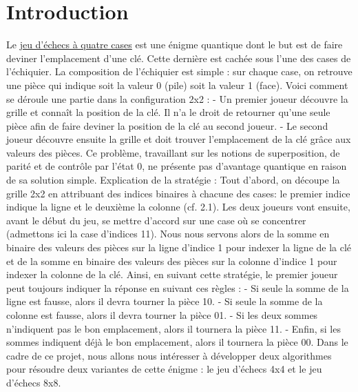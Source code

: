 \documentclass[12pt]{article}
\begin{document}
\section{Introduction}
Le \href{https://www.youtube.com/watch?v=LFwXghcajLw&list=PLtn704u3JW-K4q9YkQWTfWRxaq-9oLfJ3&index=4}{jeu d'échecs à quatre cases} est une énigme quantique dont le but est de faire deviner l'emplacement d'une clé. Cette dernière est cachée sous l'une des cases de l'échiquier.\newline
\newline
La composition de l'échiquier est simple : sur chaque case, on retrouve une pièce qui indique soit la valeur 0 (pile) soit la valeur 1 (face).\newline
\newline
Voici comment se déroule une partie dans la configuration 2x2 :
\newline
- Un premier joueur découvre la grille et connaît la position de la clé. Il n'a le droit de retourner qu'une seule pièce afin de faire deviner la position de la clé au second joueur.
\newline
- Le second joueur découvre ensuite la grille et doit trouver l'emplacement de la clé grâce aux valeurs des pièces.\newline
\newline
Ce problème, travaillant sur les notions de superposition, de parité et de contrôle par l'état 0, ne présente pas d'avantage quantique en raison de sa solution simple.\newline
\newline
Explication de la stratégie :\newline
Tout d'abord, on découpe la grille 2x2 en attribuant des indices binaires à chacune des cases: le premier indice indique la ligne et le deuxième la colonne (cf. 2.1).\newline
Les deux joueurs vont ensuite, avant le début du jeu, se mettre d'accord sur une case où se concentrer (admettons ici la case d'indices 11). Nous nous servons alors de la somme en binaire des valeurs des pièces sur la ligne d'indice 1 pour indexer la ligne de la clé et de la somme en binaire des valeurs des pièces sur la colonne d'indice 1 pour indexer la colonne de la clé.\newline
Ainsi, en suivant cette stratégie, le premier joueur peut toujours indiquer la réponse en suivant ces règles :\newline
- Si seule la somme de la ligne est fausse, alors il devra tourner la pièce 10.\newline
- Si seule la somme de la colonne est fausse, alors il devra tourner la pièce 01.\newline
- Si les deux sommes n'indiquent pas le bon emplacement, alors il tournera la pièce 11.\newline
- Enfin, si les sommes indiquent déjà le bon emplacement, alors il tournera la pièce 00.\newline
\newline
Dans le cadre de ce projet, nous allons nous intéresser à développer deux algorithmes pour résoudre deux variantes de cette énigme : le jeu d'échecs 4x4 et le jeu d'échecs 8x8.
  
\end{document}
